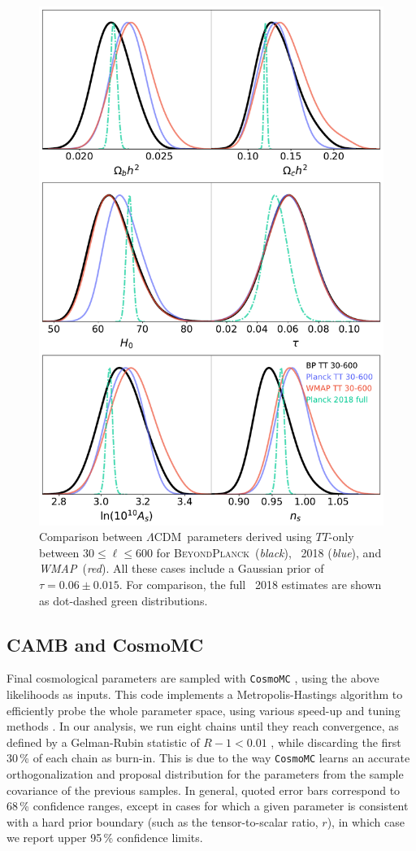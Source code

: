 \documentclass[onecolumn]{aa}
\def\WMAP{\textit{WMAP}}
\def\LCDM{$\Lambda$CDM}
\newcommand{\BP}{\textsc{BeyondPlanck}}
\begin{document}
\begin{figure}[t]
	\center
	\includegraphics[width=0.7\linewidth]{figs/BP10_LCDM_30-600.pdf}
	\caption{Comparison between \LCDM\ parameters derived using
          $TT$-only between $30\le\ell\le600$ for
          \BP\ (\emph{black}), \Planck\ 2018 (\emph{blue}), and
          \WMAP\ (\emph{red}).  All these cases include a Gaussian
          prior of $\tau=0.06\pm0.015$.  For comparison, the full
          \Planck\ 2018 estimates are shown as dot-dashed green
          distributions.}
	\label{fig:GBR-600}	
\end{figure}



\subsection{CAMB and CosmoMC}
Final cosmological parameters are sampled with \texttt{CosmoMC}
\citep{cosmomc}, using the above likelihoods as inputs. This code
implements a Metropolis-Hastings algorithm to efficiently probe the
whole parameter space, using various speed-up and tuning methods
\citep{neal2005,lewis2013b}. In our analysis, we run eight chains
until they reach convergence, as defined by a Gelman-Rubin statistic
of $R-1<0.01$ \citep{gelman:1992}, while discarding the first 30\,\%
of each chain as burn-in. This is due to the way \texttt{CosmoMC}
learns an accurate orthogonalization and proposal distribution for the
parameters from the sample covariance of the previous samples. In
general, quoted error bars correspond to 68\,\% confidence ranges,
except in cases for which a given parameter is consistent with a hard
prior boundary (such as the tensor-to-scalar ratio, $r$), in which
case we report upper 95\,\% confidence limits. 
\end{document}
